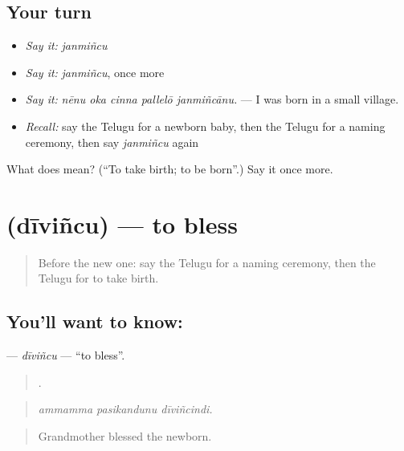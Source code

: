 \subsection*{Your turn}
\begin{itemize}
\raggedright
  \item \emph{Say it:} \emph{janmiñcu}
  \item \emph{Say it:} \emph{janmiñcu}, once more
  \item \emph{Say it:} \emph{nēnu oka cinna pallelō janmiñcānu.} — I was born in a small village.
  \item \emph{Recall:} say the Telugu for a newborn baby, then the Telugu for a naming ceremony, then say \emph{janmiñcu} again
\end{itemize}

\begin{tcolorbox}[breakable,colback=teal!4,colframe=teal!35!black,title={Before you move on}]
What does  mean? (\textquotedblleft{}To take birth; to be born\textquotedblright{}.) Say it once more.
\end{tcolorbox}
\section[\texorpdfstring{\te{దీవించు} (dīviñcu)}{దీవించు (dīviñcu)}]{ (dīviñcu) — to bless}

\label{lesson:TE-C334-divincu}



\begin{quote}
Before the new one: say the Telugu for a naming ceremony, then the Telugu for to take birth.
\end{quote}

\subsection*{You'll want to know: }
\textbf{} — \emph{dīviñcu} — \textquotedblleft{}to bless\textquotedblright{}.

\begin{quote}
  .
\end{quote}

\begin{quote}
\emph{ammamma pasikandunu dīviñcindi.}
\end{quote}

\begin{quote}
Grandmother blessed the newborn.
\end{quote}

